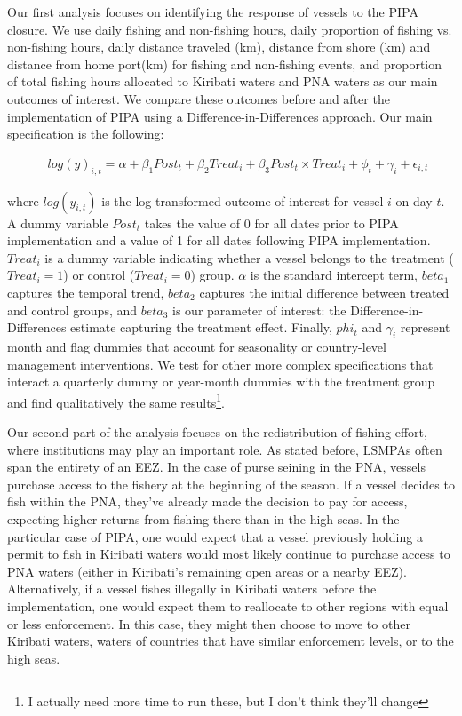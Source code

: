 \documentclass[9pttwoside,lineno]{pnas-new}
\begin{document}
Our first analysis focuses on identifying the response of 
vessels to the PIPA closure. We use daily fishing and non-fishing hours,
daily proportion of fishing vs. non-fishing hours, daily distance traveled (km), 
distance from shore (km) and distance from home port(km) for fishing and non-fishing events,
and proportion of total fishing hours allocated to Kiribati waters and PNA waters
as our main outcomes of interest.
We compare these outcomes before and after the implementation
of PIPA using a Difference-in-Differences approach. Our main
specification is the following:

\begin{figure}[h]
\begin{align*}
log(y)_{i,t} = \alpha + \beta_1 Post_t + \beta_2 Treat_i + \beta_3 Post_t \times Treat_i + \phi_t + \gamma_i + \epsilon_{i,t}
\label{eqn:did}
\end{align*}
\end{figure}

where $log(y_{i,t})$ is the log-transformed outcome of interest for vessel $i$ on day $t$.
A dummy variable $Post_t$ takes the value of 0 for all
dates prior to PIPA implementation and a value of 1 for all dates
following PIPA implementation. $Treat_i$ is a dummy
variable indicating whether a vessel belongs to the treatment ($Treat_i = 1$) or control
($Treat_i = 0$) group. $\alpha$ is
the standard intercept term, $beta_1$ captures the temporal trend,
$beta_2$ captures the initial difference between treated and control groups,
and $beta_3$ is our parameter of interest: the Difference-in-Differences estimate capturing
the treatment effect. Finally, $phi_t$ and $\gamma_i$ represent
month and flag dummies that account for seasonality or
country-level management interventions. We test for other more complex specifications
that interact a quarterly dummy or year-month dummies with the treatment group
and find qualitatively the same results\footnote{I actually need more time to run these, but I don't think they'll change}.

Our second part of the analysis focuses on the redistribution of fishing
effort, where institutions may play an important role. As stated
before, LSMPAs often span the entirety of an EEZ. In the case of purse
seining in the PNA, vessels purchase access to the fishery at the
beginning of the season. If a vessel decides to fish within the PNA,
they've already made the decision to pay for access, expecting higher
returns from fishing there than in the high seas. In the particular case
of PIPA, one would expect that a vessel previously holding a permit to fish in
Kiribati waters would 
most likely continue to purchase access to PNA waters (either in Kiribati's
remaining open areas or a nearby EEZ). Alternatively, if a vessel fishes illegally
in Kiribati waters before the implementation, one would expect them to
reallocate to other regions with equal or less enforcement. In this
case, they might then choose to move to other Kiribati waters, waters
of countries that have similar enforcement levels, or to the high seas.
\end{document}
